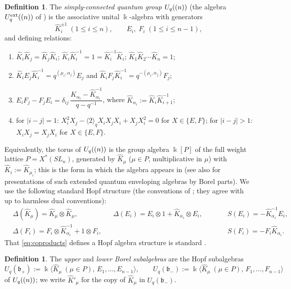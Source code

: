 \documentclass[11pt]{amsart}
\theoremstyle{definition}
\newtheorem{definition}[theorem]{Definition}
\newcommand{\BK}{\Bbbk}
\newcommand{\fb}{\mathfrak{b}}
\newcommand{\hK}{\hat K}
\newcommand{\al}{\alpha}
\begin{document}
\begin{definition}\label{def:sl}
The \emph{simply-connected quantum group} $U_q(\sl(n))$ (the algebra
$U_q^{\mathrm{ext}}(\sl(n))$ of \cite{KS}) is the associative unital
$\BK$-algebra with generators
\[
\hK_i^{\pm1}\;(1\le i\le n),\qquad E_i,\;F_i\;(1\le i\le n-1),
\]
and defining relations:
\begin{enumerate}
\item[\textup{(U1)}] $\hK_i\hK_j=\hK_j\hK_i$;\quad
$\hK_i\hK_i^{-1}=1=\hK_i^{-1}\hK_i$;\quad
$\hK_1\hK_2\cdots\hK_n=1$;
\item[\textup{(U2)}] $\hK_iE_j\hK_i^{-1}=q^{(\mu_i,\al_j)}E_j$ and
$\hK_iF_j\hK_i^{-1}=q^{-(\mu_i,\al_j)}F_j$;
\item[\textup{(U3)}] $E_iF_j-F_jE_i
=\delta_{ij}\,\dfrac{\hK_{\al_i}-\hK_{\al_i}^{-1}}{q-q^{-1}}$, where
$\hK_{\al_i}:=\hK_i\hK_{i+1}^{-1}$;
\item[\textup{(U4)}] for $|i-j|=1$:
$X_i^2X_j-\langle2\rangle_qX_iX_jX_i+X_jX_i^2=0$ for $X\in\{E,F\}$;\quad
for $|i-j|>1$: $X_iX_j=X_jX_i$ for $X\in\{E,F\}$.
\end{enumerate}
\end{definition}

Equivalently, the torus of $U_q(\sl(n))$ is the group algebra $\BK[P]$ of the
full weight lattice $P=X^*(SL_n)$, generated by $\hK_\mu$ ($\mu\in P$,
multiplicative in $\mu$) with $\hK_i:=\hK_{\mu_i}$; this is the form in which the
algebra appears in \cite{KS} (see also \cite{Cam} for presentations of such
extended quantum enveloping algebras by Borel parts). We use the following
standard Hopf structure (the conventions of \cite{UvA}; they agree with
\cite{KS,Jan,Lus} up to harmless dual conventions):
\begin{equation}\label{eq:coproducts}
\begin{aligned}
&\Delta(\hK_\mu)=\hK_\mu\otimes\hK_\mu,\qquad
&&\Delta(E_i)=E_i\otimes1+\hK_{\al_i}\otimes E_i,\qquad
&&S(E_i)=-\hK_{\al_i}^{-1}E_i,\\
&\Delta(F_i)=F_i\otimes\hK_{\al_i}^{-1}+1\otimes F_i,
&&&&S(F_i)=-F_i\hK_{\al_i}.
\end{aligned}
\end{equation}
That \eqref{eq:coproducts} defines a Hopf algebra structure is standard
\cite{KS,Jan,Lus}.

\begin{definition}\label{def:borel}
The \emph{upper} and \emph{lower Borel subalgebras} are the Hopf subalgebras
\[
U_q(\fb_+):=\BK\langle \hK_\mu\ (\mu\in P),\,E_1,\dots,E_{n-1}\rangle,\qquad
U_q(\fb_-):=\BK\langle \hK_\mu\ (\mu\in P),\,F_1,\dots,F_{n-1}\rangle
\]
of $U_q(\sl(n))$; we write $\hK'_\mu$ for the copy of $\hK_\mu$ in
$U_q(\fb_-)$.
\end{definition}
\end{document}
